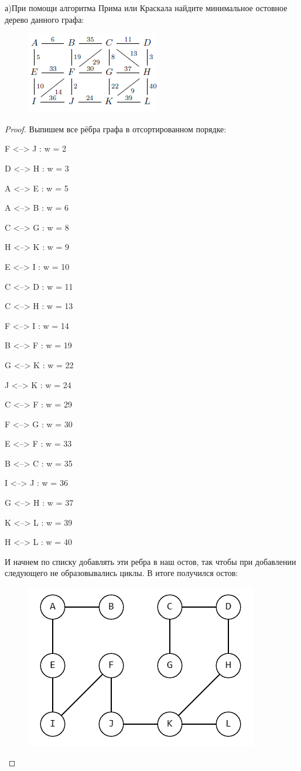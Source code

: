 \begin{problem}[16]
	а)При помощи алгоритма Прима или Краскала найдите минимальное остовное дерево данного графа:\\
    \begin{figure}[h]
    \centering
     \includegraphics[width=0.35\linewidth]{pics/Graph16th.png}
     \label{fig:dm}
    \end{figure}
    
\end{problem}

\begin{proof}
    Выпишем все рёбра графа в отсортированном порядке:

    F <--> J : w = 2

    D <--> H : w = 3 

    A <--> E : w = 5 

    A <--> B : w = 6 

    C <--> G : w = 8

    H <--> K : w = 9

    E <--> I : w = 10

    C <--> D : w = 11

    C <--> H : w = 13

    F <--> I : w = 14

    B <--> F : w = 19

    G <--> K : w = 22

    J <--> K : w = 24

    C <--> F : w = 29

    F <--> G : w = 30

    E <--> F : w = 33

    B <--> C : w = 35

    I <--> J : w = 36

    G <--> H : w = 37

    K <--> L : w = 39

    H <--> L : w = 40

    И начнем по списку добавлять эти ребра в наш остов, так чтобы при добавлении следующего не образовывались циклы. В итоге получился остов:

    \begin{figure}[h]
    \centering
     \includegraphics[width=0.35\linewidth]{pics/16th_a_solution.png}
     \label{fig:dm}
    \end{figure}
\end{proof}
